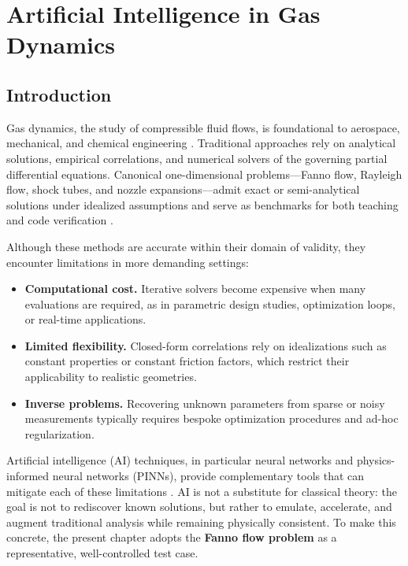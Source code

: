 \documentclass[11pt,a4paper]{report}
\begin{document}
\chapter{Artificial Intelligence in Gas Dynamics}


\section{Introduction}
Gas dynamics, the study of compressible fluid flows, is foundational to aerospace, mechanical, and chemical engineering \cite{White2011}. Traditional approaches rely on analytical solutions, empirical correlations, and numerical solvers of the governing partial differential equations. Canonical one-dimensional problems---Fanno flow, Rayleigh flow, shock tubes, and nozzle expansions---admit exact or semi-analytical solutions under idealized assumptions and serve as benchmarks for both teaching and code verification \cite{Anderson1990, Pontes2019, Anderson2021}.

Although these methods are accurate within their domain of validity, they encounter limitations in more demanding settings:
\begin{itemize}
    \item \textbf{Computational cost.} Iterative solvers become expensive when many evaluations are required, as in parametric design studies, optimization loops, or real-time applications.
    \item \textbf{Limited flexibility.} Closed-form correlations rely on idealizations such as constant properties or constant friction factors, which restrict their applicability to realistic geometries.
    \item \textbf{Inverse problems.} Recovering unknown parameters from sparse or noisy measurements typically requires bespoke optimization procedures and ad-hoc regularization.
\end{itemize}

Artificial intelligence (AI) techniques, in particular neural networks and physics-informed neural networks (PINNs), provide complementary tools that can mitigate each of these limitations \cite{Raissi2019PINN, Michaloglou2025, Ren2025, Roohi2025}. AI is not a substitute for classical theory: the goal is not to rediscover known solutions, but rather to emulate, accelerate, and augment traditional analysis while remaining physically consistent. To make this concrete, the present chapter adopts the \textbf{Fanno flow problem} as a representative, well-controlled test case.
\end{document}
